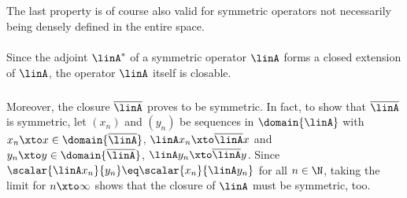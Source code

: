 \documentclass[11pt,twoside]{article}
\begin{document}
\subparagraph{}
The last property is of course also valid for symmetric operators
not necessarily being densely defined in the entire space.

\paragraph{}
Since the adjoint $\linA^*$ of a symmetric operator $\linA$
forms a closed extension of $\linA$,
the operator $\linA$ itself is closable.

\subparagraph{}
Moreover,
the closure $\overline{\linA}$ proves to be symmetric.
In fact,
to show that $\overline{\linA}$ is symmetric,
let $(x_n)$ and $(y_n)$ be sequences in $\domain{\linA}$
with $x_n \xto x \in \domain{\overline{\linA}}$,
$\linA x_n \xto \overline{\linA} x$
and $y_n \xto y \in \domain{\overline{\linA}}$,
$\linA y_n \xto \overline{\linA} y$.
Since $\scalar{\linA x_n}{y_n} \eq \scalar{x_n}{\linA y_n}$
for all $n \in \N$,
taking the limit for $n \xto \infty$ shows
that the closure of $\linA$ must be symmetric, too.
\end{document}
